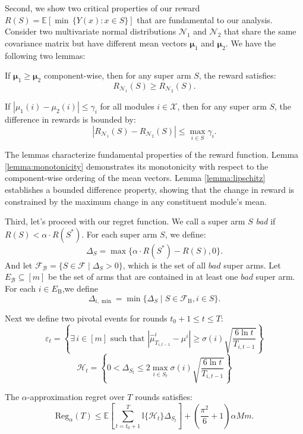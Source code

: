 \documentclass[opre,sglanonrev]{informs4}
\begin{document}
Second, we show two critical properties of our reward $R(S) = \mathbb{E}[\min\,\{Y(x) : x \in S\}]$ that are fundamental to our analysis. Consider two multivariate normal distributions $\mathcal{N}_1$ and $\mathcal{N}_2$ that share the same covariance matrix but have different mean vectors $\boldsymbol{\mu}_1$ and $\boldsymbol{\mu}_2$. We have the following two lemmas:

\begin{lemma}
\label{lemma:monotonicity}
If $\boldsymbol{\mu}_1 \geq \boldsymbol{\mu}_2$ component-wise, then for any super arm $S$, the reward satisfies:
$$
R_{\mathcal{N}_1}(S) \geq R_{\mathcal{N}_2}(S).
$$
\end{lemma}

\begin{lemma}
\label{lemma:lipschitz}
If $|\mu_1(i) - \mu_2(i)| \leq \gamma_i$ for all modules $i \in \mathcal{X}$, then for any super arm $S$, the difference in rewards is bounded by:
$$
|R_{\mathcal{N}_1}(S) - R_{\mathcal{N}_2}(S)| \leq \max_{i \in S} \gamma_i.
$$
\end{lemma}
The lemmas characterize fundamental properties of the reward function. Lemma \ref{lemma:monotonicity} demonstrates its monotonicity with respect to the component-wise ordering of the mean vectors. Lemma \ref{lemma:lipschitz} establishes a bounded difference property, showing that the change in reward is constrained by the maximum change in any constituent module's mean.

Third, let's proceed with our regret function. We call a super arm $S$ \textit{bad} if $R(S)<\alpha\cdot R(S^*)$. For each super arm $S$, we define:
$$
\Delta_S =\max\{\alpha\cdot R(S^*)-R(S),0\}.
$$
And let $\mathcal{F} _{\mathcal{B} }= \{ S\in \mathcal{F} \mid \Delta _S> 0\}$, which is the set of all $\textit{bad}$ super arms.  Let $E_{\mathcal{B} }\subseteq [m]$ be the set of arms that are contained in at least one $\textit{bad}$ super arm. For each $i\in E_{\mathrm{B}}$,we define
$$\Delta_{i,\min}=\min\{\Delta_S\mid S\in\mathcal{F}_\text{B},i\in S\}.$$

Next we define two pivotal events for rounds \(t_0+1 \leq t \leq T\):
$$
\varepsilon_t = \left\{\exists\, i \in [m] \text{ such that } \left|\hat{\mu}_{T_{i,t-1}}^i - \mu^i\right| \geq \sigma(i)\sqrt{\frac{6\ln t}{T_{i,t-1}}} \right\}
$$
$$
\mathcal{H}_t = \left\{0 < \Delta_{S_t} \leq 2 \max_{i \in S_t} \sigma(i)\sqrt{\frac{6\ln t}{T_{i,t-1}}} \right\}
$$

\begin{lemma}
\label{lemma:decomposition}
The \(\alpha\)-approximation regret over \(T\) rounds satisfies:
$$
\text{Reg}_{\alpha}(T) \leq \mathbb{E}\left[\sum_{t=t_0+1}^{T} \mathbb{I}\{\mathcal{H}_t\} \Delta_{S_t}\right] + \left(\frac{\pi^2}{6} + 1\right) \alpha M m.
$$
\end{lemma}
\end{document}
